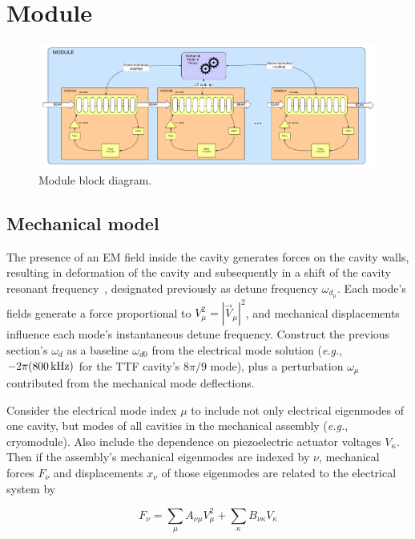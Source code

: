 \documentclass[a4paper,12pt]{article}
\begin{document}
\newpage

\section{Module}

\begin{figure}
\centering
\includegraphics[scale=0.08]{../figures/Module_block_diagram.png}
\caption{Module block diagram.}
\label{fig:Module_block_diagram}
\end{figure}

\subsection{Mechanical model}

The presence of an EM field inside the cavity generates forces on the cavity walls, resulting in deformation of the cavity and subsequently in a shift of the cavity resonant frequency~\cite{ref:delayen}, designated previously as detune frequency $\omega_{d_\mu}$. Each mode's fields generate a force proportional to $V_\mu^2 = |\vec V_\mu|^2$, and mechanical displacements influence each mode's instantaneous detune frequency.  Construct the previous section's $\omega_d$ as
a baseline $\omega_{d0}$ from the electrical mode solution ({\it e.g.}, $-2\pi (800\thinspace {\rm kHz})$ for the TTF cavity's $8\pi/9$ mode), plus a perturbation $\omega_{\mu}$ contributed from the mechanical mode deflections. 

Consider the electrical mode index $\mu$ to include not only electrical eigenmodes of one cavity, but modes of all cavities in the mechanical assembly ({\it e.g.}, cryomodule). Also include the dependence on piezoelectric actuator voltages $V_\kappa$. Then if the assembly's mechanical eigenmodes are indexed by $\nu$, mechanical forces $F_\nu$ and displacements $x_\nu$ of those eigenmodes are related to the electrical system by

\begin{equation}
F_\nu = \sum_\mu A_{\nu\mu} V_\mu^2 + \sum_\kappa B_{\nu\kappa}V_\kappa
\end{equation}
\end{document}
